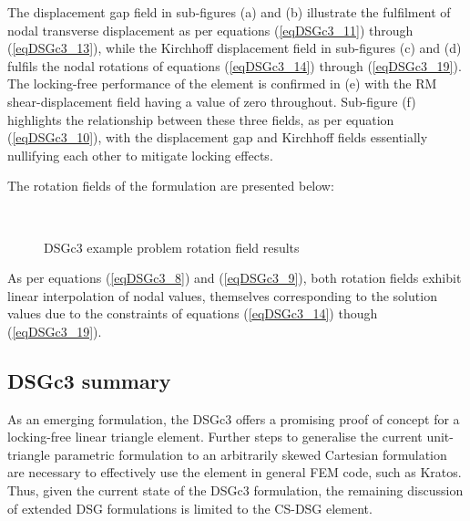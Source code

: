 The displacement gap field in sub-figures (a) and (b) illustrate the fulfilment of nodal transverse displacement as per equations (\ref{eqDSGc3_11}) through (\ref{eqDSGc3_13}), while the Kirchhoff displacement field in sub-figures (c) and (d) fulfils the nodal rotations of equations (\ref{eqDSGc3_14}) through (\ref{eqDSGc3_19}). The locking-free performance of the element is confirmed in (e) with the RM shear-displacement field having a value of zero throughout. Sub-figure (f) highlights the relationship between these three fields, as per equation (\ref{eqDSGc3_10}), with the displacement gap and Kirchhoff fields essentially nullifying each other to mitigate locking effects.

The rotation fields of the formulation are presented below:

\begin{figure}[H]
	\\
	\caption{\label{csdsgc3_resul1t}DSGc3 example problem rotation field results}
\end{figure}

As per equations (\ref{eqDSGc3_8}) and (\ref{eqDSGc3_9}), both rotation fields exhibit linear interpolation of nodal values, themselves corresponding to the solution values due to the constraints of equations (\ref{eqDSGc3_14}) though (\ref{eqDSGc3_19}).

\subsection{DSGc3 summary}
As an emerging formulation, the DSGc3 offers a promising proof of concept for a locking-free linear triangle element. Further steps to generalise the current unit-triangle parametric formulation to an arbitrarily skewed Cartesian formulation are necessary to effectively use the element in general FEM code, such as Kratos. Thus, given the current state of the DSGc3 formulation, the remaining discussion of extended DSG formulations is limited to the CS-DSG element.

